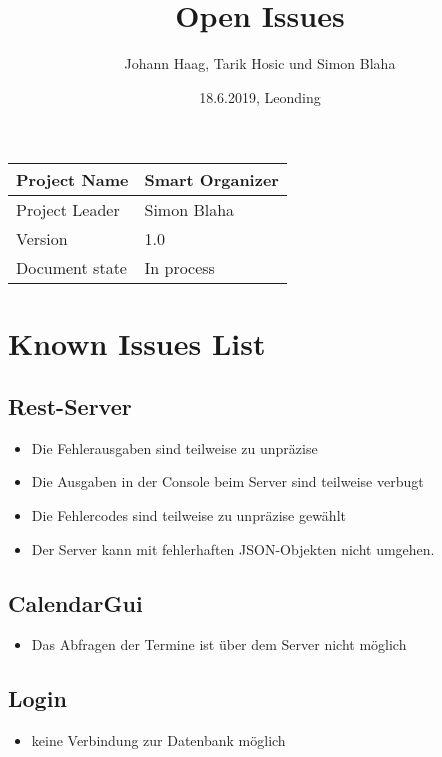 \documentclass[12pt]{scrartcl}
\title{Open Issues}
\author{Johann Haag, Tarik Hosic und Simon Blaha}
\date{18.6.2019, Leonding}
\begin{document}
    \maketitle
    \begin{flushleft}
    \begin{tabular}{|l|l|}
    \hline
    Project Name & Smart Organizer \\ \hline
    Project Leader & Simon Blaha \\ \hline
    Version & 1.0\\ \hline
    Document state & In process \\ \hline
    \end{tabular}
    \end{flushleft}

    \pagebreak
    \tableofcontents
    \pagebreak

    \section{Known Issues List}
    \subsection{Rest-Server}
    \begin{itemize}
        \item Die Fehlerausgaben sind teilweise zu unpräzise 
        \item Die Ausgaben in der Console beim Server sind teilweise verbugt 
        \item Die Fehlercodes sind teilweise zu unpräzise gewählt
        \item Der Server kann mit fehlerhaften JSON-Objekten nicht umgehen.
    \end{itemize}

    \subsection{CalendarGui}
    \begin{itemize}
        \item Das Abfragen der Termine ist über dem Server nicht möglich
    \end{itemize}

    \subsection{Login}
    \begin{itemize}
        \item keine Verbindung zur Datenbank möglich
    \end{itemize}
\end{document}
